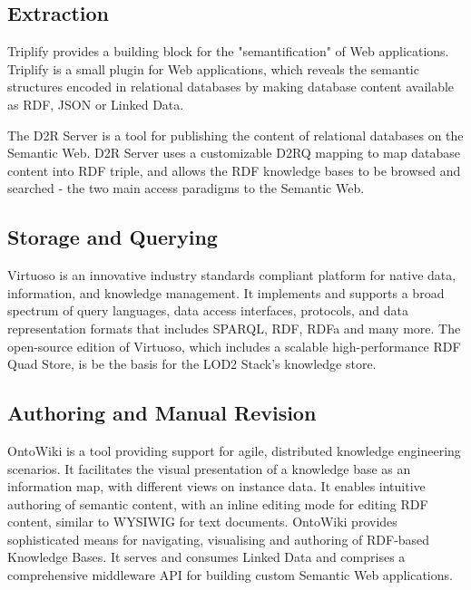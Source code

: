 \documentclass[a4paper, 11pt]{llncs}
\begin{document}
\subsection{Extraction}

Triplify \cite{triplify_www} provides a building block for the "semantification" of Web applications.
Triplify is a small plugin for Web applications, which reveals the semantic structures encoded in relational databases by making database content available as RDF, JSON or Linked Data.

The D2R Server \cite{d2rposter} is a tool for publishing the content of relational databases on the Semantic Web.
D2R Server uses a customizable D2RQ mapping to map database content into RDF triple, and allows the RDF knowledge bases to be browsed and searched - the two main access paradigms to the Semantic Web.

\subsection{Storage and Querying}

Virtuoso \cite{virtuoso} is an innovative industry standards compliant platform for native data, information, and knowledge management.
It implements and supports a broad spectrum of query languages, data access interfaces, protocols, and data representation formats that includes SPARQL, RDF, RDFa and many more.
The open-source edition of Virtuoso, which includes a scalable high-performance RDF Quad Store, is be the basis for the LOD2 Stack's knowledge store.

\subsection{Authoring and Manual Revision}

OntoWiki \cite{auer-s-2006-736-a} is a tool providing support for agile, distributed knowledge engineering scenarios.
It facilitates the visual presentation of a knowledge base as an information map, with different views on instance data.
It enables intuitive authoring of semantic content, with an inline editing mode for editing RDF content, similar to WYSIWIG for text documents.
OntoWiki provides sophisticated means for navigating, visualising and authoring of RDF-based Knowledge Bases.
It serves and consumes Linked Data and comprises a comprehensive middleware API for building custom Semantic Web applications.
\end{document}
